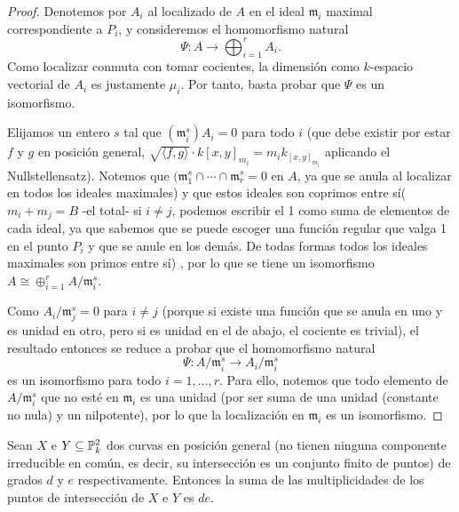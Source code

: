\documentclass[ACGA.tex]{subfiles}
\begin{document}
\begin{proof}
Denotemos por $A_i$ al localizado de $A$ en el ideal ${\mathfrak m}_i$ maximal correspondiente a $P_i$, y consideremos el homomorfismo natural
$$
\Psi:A\to\bigoplus_{i=1}^{r} A_i.
$$
Como localizar conmuta con tomar cocientes, la dimensión como $k$-espacio vectorial de $A_i$ es justamente $\mu_i$. Por tanto, basta probar que $\Psi$ es un isomorfismo.

Elijamos un entero $s$ tal que $({\mathfrak m}_i^s)A_i=0$ para todo $i$ (que debe existir por estar $f$ y $g$ en posición general, $\sqrt{\langle f,g\rangle} \cdot k[x,y]_{m_i}=m_ik_[x,y]_{m_i}$ aplicando el Nullstellensatz). Notemos que $({\mathfrak m}_1^s\cap\cdots\cap{\mathfrak m}_r^s=0$ en $A$, ya que se anula al localizar en todos los ideales maximales) y que estos ideales son coprimos entre sí($m_i+m_j=B$ -el total- si $i\neq j$, podemos escribir el 1 como suma de elementos de cada ideal, ya que sabemos que se puede escoger una función regular que valga 1 en el punto $P_i$ y que se anule en los demás. De todas formas todos los ideales maximales son primos entre sí) ,  por lo que se tiene un isomorfismo $A\cong\oplus_{i=1}^r A/{\mathfrak m}_i^s$.

Como $A_i/{\mathfrak m}_j^s=0$ para $i\neq j$ (porque si existe una función que se anula en uno y es unidad en otro, pero si es unidad en el de abajo, el cociente es trivial), el resultado entonces se reduce a probar que el homomorfismo natural
$$
\Psi:A/{\mathfrak m}_i^s\to A_i/{\mathfrak m}_i^s
$$
es un isomorfismo para todo $i=1,\ldots,r$. Para ello, notemos que todo elemento de $A/{\mathfrak m}_i^s$ que no esté en ${\mathfrak m}_i$ es una unidad (por ser suma de una unidad (constante no nula) y un nilpotente), por lo que la localización en ${\mathfrak m}_i$ es un isomorfismo.
\end{proof}
\begin{teorema}[\bf de Bézout]
Sean $X$ e $Y\subseteq\mathbb{P}^2_k$ dos curvas en posición general (no tienen ninguna componente irreducible en común, es decir, su intersección es un conjunto finito de puntos) de grados $d$ y $e$ respectivamente. Entonces la suma de las multiplicidades de los puntos de intersección de $X$ e $Y$ es $de$.
\end{teorema}
\end{document}

